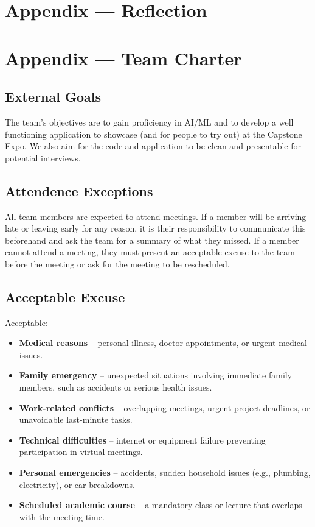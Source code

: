 \documentclass{article}
\begin{document}
\section{Appendix --- Reflection}



\section{Appendix --- Team Charter}

\subsection{External Goals}

The team's objectives are to gain proficiency in AI/ML and to develop a well functioning application to showcase (and for people to try out) at the Capstone Expo. We also aim for the code and application to be clean and presentable for potential interviews.

\subsection{Attendence Exceptions}

All team members are expected to attend meetings. If a member will be arriving late or leaving early for any reason, it is their responsibility to communicate this beforehand and ask the team for a summary of what they missed. If a member cannot attend a meeting, they must present an acceptable excuse to the team before the meeting or ask for the meeting to be rescheduled.

\subsection{Acceptable Excuse}


Acceptable:\\
\begin {itemize}
    \item \textbf{Medical reasons} – personal illness, doctor appointments, or urgent medical issues.
    \item \textbf{Family emergency} – unexpected situations involving immediate family members, such as accidents or serious health issues.
    \item \textbf{Work-related conflicts} – overlapping meetings, urgent project deadlines, or unavoidable last-minute tasks. 
    \item \textbf{Technical difficulties} – internet or equipment failure preventing participation in virtual meetings.
    \item \textbf{Personal emergencies} – accidents, sudden household issues (e.g., plumbing, electricity), or car breakdowns.
    \item \textbf{Scheduled academic course} – a mandatory class or lecture that overlaps with the meeting time.
\end{itemize}
\end{document}
